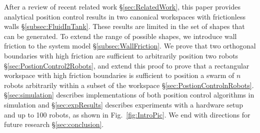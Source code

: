 After a review of recent related work \S \ref{sec:RelatedWork}, this paper provides analytical position control results in two canonical workspaces with frictionless walls \S\ref{subsec:FluidInTank}.  These results are limited in the set of shapes that can be generated.  To extend the range of possible shapes, we introduce wall friction to the system model \S \ref{subsec:WallFriction}.  We prove that two orthogonal boundaries with high friction are sufficient to arbitrarily position two robots \S \ref{sec:PostionControl2Robots}, and extend this proof to prove that a rectangular workspace with high friction boundaries is sufficient to position a swarm of $n$ robots arbitrarily within a subset of the workspace \S \ref{sec:PostionControlnRobots}.
\S \ref{sec:simulation} describes implementations of both position control algorithms in simulation and  \S \ref{sec:expResults} describes experiments with a hardware setup and up to 100 robots, as shown in Fig.~\ref{fig:IntroPic}. We end with directions for future research \S \ref{sec:conclusion}.
